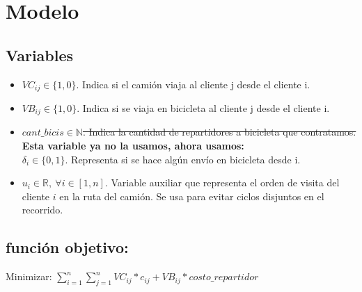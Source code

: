 \documentclass[11pt,a4paper]{article}
\begin{document}
\section*{Modelo} 

\subsection{Variables}
\begin{itemize}
    \item $VC_{ij} \in \{1,0\}$. Indica si el camión viaja al cliente j desde el cliente i.
    \item $VB_{ij}\in \{1,0\}$. Indica si se viaja en bicicleta al cliente j desde el cliente i.
    \item \st{$cant\_bicis \in \mathbb{N}$. Indica la cantidad de repartidores a bicicleta que contratamos. } \textbf{Esta variable ya no la usamos, ahora usamos:\\}
    $\delta_i \in \{0,1\}.$ Representa si se hace algún envío en bicicleta desde i.
    \item $u_i \in \mathbb{R},\ \forall i \in [1, n]$. Variable auxiliar que representa el orden de visita del cliente $i$ en la ruta del camión. Se usa para evitar ciclos disjuntos en el recorrido.

\end{itemize}
\subsection{función objetivo:}
{Minimizar: $\sum_{i=1}^{n} \sum_{j=1}^{n} VC_{ij}*c_{ij} + VB_{ij}*costo\_repartidor$}
\end{document}
